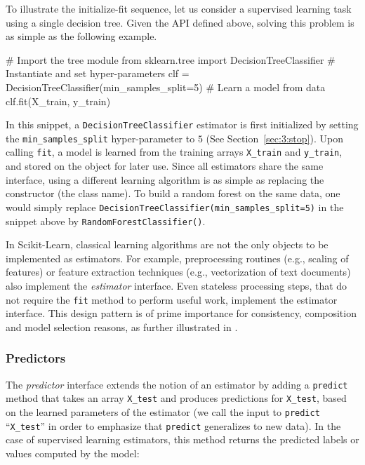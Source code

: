 To illustrate the initialize-fit sequence, let us consider a supervised
learning task using a single decision tree. Given the API defined above,
solving this problem is as simple as the following example.

\vskip0.3cm
\begin{pythoncode}
# Import the tree module
from sklearn.tree import DecisionTreeClassifier
# Instantiate and set hyper-parameters
clf = DecisionTreeClassifier(min_samples_split=5)
# Learn a model from data
clf.fit(X_train, y_train)
\end{pythoncode}

In this snippet, a \texttt{DecisionTreeClassifier} estimator is first
initialized by setting the \texttt{min\_samples\_split} hyper-parameter to $5$
(See Section~\ref{sec:3:stop}). Upon calling \texttt{fit}, a model is learned
from the training arrays \texttt{X\_train} and \texttt{y\_train}, and stored on
the object for later use. Since all estimators share the same interface, using
a different learning algorithm is as simple as replacing the constructor (the
class name). To build a random forest on the same data, one would simply
replace \texttt{DecisionTreeClassifier(min\_samples\_split=5)} in the snippet
above by \texttt{RandomForestClassifier()}.

In Scikit-Learn, classical learning algorithms are not the only objects to be
implemented as estimators. For example, preprocessing routines (e.g., scaling
of features) or feature extraction techniques (e.g., vectorization of text
documents) also implement the \textit{estimator} interface. Even stateless
processing steps, that do not require the \texttt{fit} method to perform useful
work, implement the estimator interface. This design pattern is of prime
importance for consistency, composition and model selection reasons,
as further illustrated in \citep{buitinck:2013}.

\subsubsection{Predictors}

The \textit{predictor} interface extends the notion of an estimator by adding a
\texttt{predict} method that takes an array \texttt{X\_test} and produces
predictions for \texttt{X\_test}, based on the learned parameters of the
estimator (we call the input to \texttt{predict} ``\texttt{X\_test}'' in order
to emphasize that \texttt{predict} generalizes to new data). In the case of
supervised learning estimators, this method returns the predicted labels or
values computed by the model:

